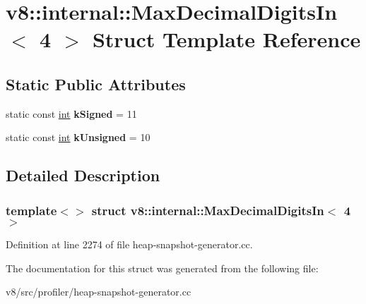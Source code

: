 \hypertarget{structv8_1_1internal_1_1MaxDecimalDigitsIn_3_014_01_4}{}\section{v8\+:\+:internal\+:\+:Max\+Decimal\+Digits\+In$<$ 4 $>$ Struct Template Reference}
\label{structv8_1_1internal_1_1MaxDecimalDigitsIn_3_014_01_4}
\subsection*{Static Public Attributes}
\begin{DoxyCompactItemize}
\item 
\mbox{\label{structv8_1_1internal_1_1MaxDecimalDigitsIn_3_014_01_4_a337b121e0c27c67f824a4c8712ba1298}} 
static const \mbox{\hyperlink{classint}{int}} {\bfseries k\+Signed} = 11
\item 
\mbox{\label{structv8_1_1internal_1_1MaxDecimalDigitsIn_3_014_01_4_a9d173ab24eb5214a977edd4832757639}} 
static const \mbox{\hyperlink{classint}{int}} {\bfseries k\+Unsigned} = 10
\end{DoxyCompactItemize}


\subsection{Detailed Description}
\subsubsection*{template$<$$>$\newline
struct v8\+::internal\+::\+Max\+Decimal\+Digits\+In$<$ 4 $>$}



Definition at line 2274 of file heap-\/snapshot-\/generator.\+cc.



The documentation for this struct was generated from the following file\+:\begin{DoxyCompactItemize}
\item 
v8/src/profiler/heap-\/snapshot-\/generator.\+cc\end{DoxyCompactItemize}
